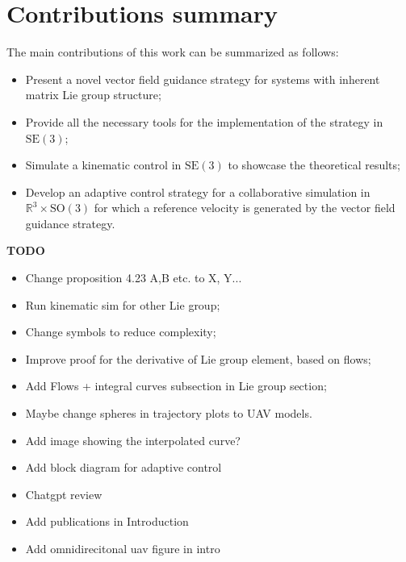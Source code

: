 \section{Contributions summary}
The main contributions of this work can be summarized as follows:
\begin{itemize}
    \item Present a novel vector field guidance strategy for systems with inherent matrix Lie group structure;
    \item Provide all the necessary tools for the implementation of the strategy in $\text{SE}(3)$;
    \item Simulate a kinematic control in $\text{SE}(3)$ to showcase the theoretical results;
    \item Develop an adaptive control strategy for a collaborative simulation in $\mathbb{R}^3\times\text{SO}(3)$ for which a reference velocity is generated by the vector field guidance strategy.
\end{itemize}

\textbf{TODO}
\begin{itemize}
    \item Change proposition 4.23 A,B etc. to X, Y...
    \item Run kinematic sim for other Lie group;
    \item Change symbols to reduce complexity;
    \item Improve proof for the derivative of Lie group element, based on flows;
    \item Add Flows + integral curves subsection in Lie group section;
    \item Maybe change spheres in trajectory plots to UAV models.
    \item Add image showing the interpolated curve?
    \item Add block diagram for adaptive control
    \item Chatgpt review
    \item Add publications in Introduction
    \item Add omnidirecitonal uav figure in intro
\end{itemize}
